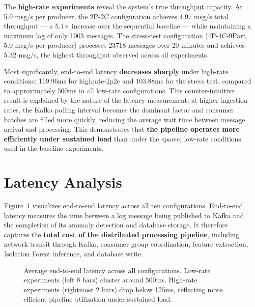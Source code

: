 \documentclass[12pt,a4paper]{report}
\begin{document}
The \textbf{high-rate experiments} reveal the system's true throughput capacity.
At 5.0 msg/s per producer, the 2P-2C configuration achieves 4.97 msg/s total throughput
--- a 5.1$\times$ increase over the sequential baseline --- while maintaining a maximum
lag of only 1003 messages. The stress-test configuration (4P-4C-9Part, 5.0 msg/s per
producer) processes 23718 messages over 20 minutes and achieves 5.32 msg/s, the highest
throughput observed across all experiments.

Most significantly, end-to-end latency \textbf{decreases sharply} under high-rate
conditions: 119.96ms for highrate-2p2c and 103.88ms for the stress test, compared to
approximately 500ms in all low-rate configurations. This counter-intuitive result is
explained by the nature of the latency measurement: at higher ingestion rates, the Kafka
polling interval becomes the dominant factor and consumer batches are filled more
quickly, reducing the average wait time between message arrival and processing. This
demonstrates that \textbf{the pipeline operates more efficiently under sustained load}
than under the sparse, low-rate conditions used in the baseline experiments.

\section{Latency Analysis}

Figure~\ref{fig:latency-comparison} visualizes end-to-end latency across all ten
configurations. End-to-end latency measures the time between a log message being
published to Kafka and the completion of its anomaly detection and database storage.
It therefore captures the \textbf{total cost of the distributed processing pipeline},
including network transit through Kafka, consumer group coordination, feature
extraction, Isolation Forest inference, and database write.

\begin{figure}[htbp]
\centering
{}
\caption{Average end-to-end latency across all configurations. Low-rate experiments
(left 8 bars) cluster around 500ms. High-rate experiments (rightmost 2 bars) drop
below 125ms, reflecting more efficient pipeline utilization under sustained load.}
\label{fig:latency-comparison}
\end{figure}
\end{document}
